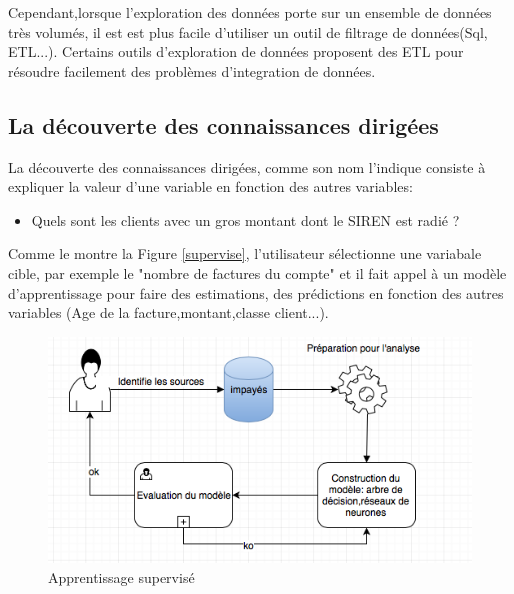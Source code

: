 \documentclass[11pt,a4paper]{report}
\begin{document}
Cependant,lorsque l'exploration des données porte sur un ensemble de données très volumés, il est est plus facile d'utiliser un outil de filtrage de données(Sql, ETL...).
Certains outils d'exploration de données proposent des ETL pour résoudre facilement des problèmes d'integration de données.   

\subsection{La découverte des connaissances dirigées}

La découverte des connaissances dirigées, comme son nom l'indique consiste à expliquer la valeur d'une variable en fonction des autres variables:
\begin{itemize}
\item Quels sont les clients avec un gros montant dont le SIREN est radié ?
\end{itemize}
Comme le montre la Figure \ref{supervise}, l'utilisateur sélectionne une variabale cible,  par exemple le "nombre de factures du compte" et il fait appel à un modèle d'apprentissage pour faire des estimations, des prédictions en fonction des autres variables (Age de la facture,montant,classe client...).  


\begin{figure}[h]
\centering
\includegraphics[scale=0.70]{dirigees.png}
\caption{Apprentissage supervisé}
\end{figure}
\label{supervise}
\newpage
\end{document}

